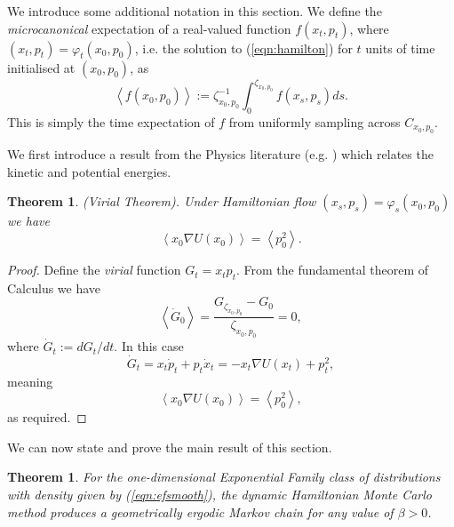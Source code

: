 \documentclass[bj,numbers,noshowframe]{imsart}
\theoremstyle{definition}
\theoremstyle{plain}
\newtheorem{thm}[defn]{Theorem}
\theoremstyle{definition}
\begin{document}
We introduce some additional notation in this section.  We define the \emph{microcanonical} expectation of a real-valued function $f(x_t,p_t)$, where $(x_t,p_t) = \varphi_t(x_0,p_0)$, i.e. the solution to (\ref{eqn:hamilton}) for $t$ units of time initialised at $(x_0,p_0)$, as
\begin{equation}
\left< f(x_0,p_0) \right> := \zeta_{x_0,p_0}^{-1} \int_0^{\zeta_{x_0,p_0}} f(x_s,p_s)ds.
\end{equation}
This is simply the time expectation of $f$ from uniformly sampling across $C_{x_0,p_0}$.

We first introduce a result from the Physics literature (e.g. \citep{goldstein1965classical}) which relates the kinetic and potential energies.

\begin{thm} (Virial Theorem). \label{thm:virial}
Under Hamiltonian flow $(x_{s},p_{s}) = \varphi_s(x_0,p_0)$ we have
\begin{equation} \label{eqn:vt1}
\left< x_0\nabla U(x_0) \right> = \left< p_0^2 \right>.
\end{equation}
\end{thm}

\begin{proof} Define the \emph{virial} function $G_t = x_tp_t$.  From the fundamental theorem of Calculus we have
\[
\left< \dot{G}_0 \right> = \frac{G_{\zeta_{x_0,p_0}} - G_0}{\zeta_{x_0,p_0}} = 0,
\]
where $\dot{G}_t := dG_t/dt$.  In this case
\[
\dot{G}_t = x_t \dot{p}_t + p_t\dot{x}_t = -x_t \nabla U(x_t) + p_t^2,
\]
meaning
\[
\left< x_0 \nabla U(x_0) \right> = \left< p_0^2 \right>,
\]
as required.
\end{proof}

We can now state and prove the main result of this section.

\begin{thm} \label{thm:dynamic}
For the one-dimensional Exponential Family class of distributions with density given by (\ref{eqn:efsmooth}), the dynamic Hamiltonian Monte Carlo method produces a geometrically ergodic Markov chain for any value of $\beta > 0$.
\end{thm}
\end{document}
